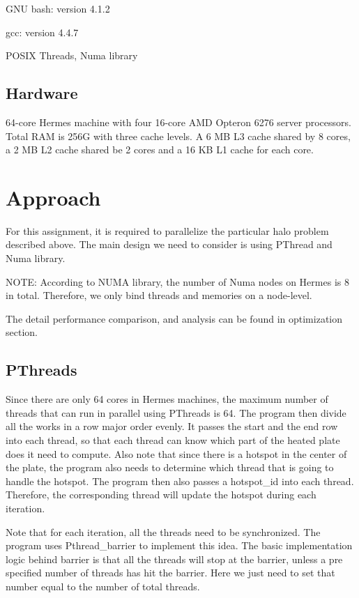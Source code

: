 \documentclass{cs4444}
\begin{document}
	GNU bash: version 4.1.2
	
	gcc: version 4.4.7
	
	POSIX Threads, Numa library

\subsection{Hardware}
	64-core Hermes machine with four 16-core AMD Opteron 6276 server processors. Total RAM is 256G with three cache levels. A 6 MB L3 cache shared by 8 cores, a 2 MB L2 cache shared be 2 cores and a 16 KB L1 cache for each core. 
	
\section{Approach}
	For this assignment, it is required to parallelize the particular halo problem described above. The main design we need to consider is using PThread and Numa library.
		
	NOTE: According to NUMA library, the number of Numa nodes on Hermes is 8 in total. Therefore, we only bind threads and memories on a node-level.
	
	The detail performance comparison, and analysis can be found in optimization section.
	
	\subsection{PThreads}
		Since there are only 64 cores in Hermes machines, the maximum number of threads that can run in parallel using PThreads is 64. The program then divide all the works in a row major order evenly. It passes the start and the end row into each thread, so that each thread can know which part of the heated plate does it need to compute. Also note that since there is a hotspot in the center of the plate, the program also needs to determine which thread that is going to handle the hotspot. The program then also passes a hotspot\_id into each thread. Therefore, the corresponding thread will update the hotspot during each iteration. 
		
		Note that for each iteration, all the threads need to be synchronized. The program uses Pthread\_barrier to implement this idea. The basic implementation logic behind barrier is that all the threads will stop at the barrier, unless a pre specified number of threads has hit the barrier. Here we just need to set that number equal to the number of total threads.
	
\end{document}
